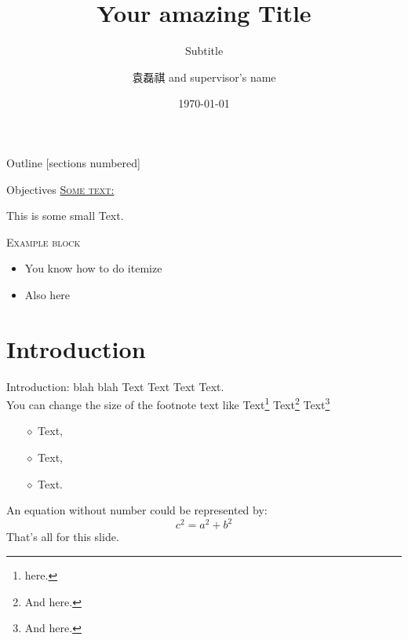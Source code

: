 \documentclass[10pt,xcolor=svgnames]{beamer} %
\title{Your amazing Title}
\author[Name]{袁磊祺 \inst{$\dagger$} and supervisor's name} %
\subtitle{Subtitle}
\institute[uni]{\inst{$\dagger$} 北京大学工学院力学与工程科学系}
\date{\today} %
\begin{document}
{
\maketitle
}%


\begin{frame}{Outline}
    [sections numbered] %
    \tableofcontents[hideallsubsections] %
\end{frame}

\begin{frame}{Objectives}
    \underline{\textsc{Some text:}}
    \begin{small}
        This is some small Text.
    \end{small}

    \begin{exampleblock}{\textsc{Example block}}
        \begin{itemize}
            \item You know how to do itemize
            \item Also here
        \end{itemize}
    \end{exampleblock}
\end{frame}


\section{Introduction}

\begin{frame}[fragile]{Introduction: blah blah} %
    Text Text Text Text. \\You can change the size of the footnote text like  Text\footnote{\small{ here.}} Text\footnote{\large{And here.}} Text\footnote{\tiny{And here.}}
    \begin{itemize} %
        \item[$\diamond$] Text,
        \item[$\diamond$] Text,
        \item[$\diamond$] Text.
    \end{itemize}
    An equation without number could be represented by:
    \begin{equation*}
        c^{2} = a^{2} + b^{2}
    \end{equation*}
    That's all for this slide.
\end{frame}
\end{document}
